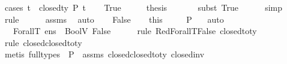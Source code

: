 \begin{isabellebody}
%
\isadelimproof
%
\endisadelimproof
%
\isatagproof
{}\isamarkupfalse%
\ {\isacharparenleft}{\kern0pt}cases\ {\isachardoublequoteopen}{\isasymforall}t\ {\isacharcolon}{\kern0pt}{\isacharcolon}{\kern0pt}\ closed{\isacharunderscore}{\kern0pt}ty{\isachardot}{\kern0pt}\ P\ t{\isachardoublequoteclose}{\isacharparenright}{\kern0pt}\isanewline
\ \ \isamarkupfalse%
\ True\isanewline
\ \ \isamarkupfalse%
\ \isamarkupfalse%
\ {\isacharquery}{\kern0pt}thesis\ \isanewline
\ \ \ \ \isamarkupfalse%
\ {\isacharparenleft}{\kern0pt}subst\ True{\isacharparenright}{\kern0pt}\isanewline
\ \ \ \ \isamarkupfalse%
\ simp\isanewline
\ \ \ \ \isamarkupfalse%
\ rule\isanewline
\ \ \ \ \isamarkupfalse%
\ assms\ \isamarkupfalse%
\ auto\isanewline
{}\isamarkupfalse%
\isanewline
\ \ \isamarkupfalse%
\ False\isanewline
\ \ \isamarkupfalse%
\ this\ \isamarkupfalse%
\ {\isasymtau}\ \ {\isachardoublequoteopen}{\isasymnot}\ P\ {\isasymtau}{\isachardoublequoteclose}\ \isamarkupfalse%
\ auto\isanewline
\ \ \isamarkupfalse%
\ {\isachardoublequoteopen}{\isasymLambda}{\isacharcomma}{\kern0pt}{\isasymGamma}{\isacharcomma}{\kern0pt}{\isasymOmega}\ {\isasymturnstile}\ {\isasymlangle}ForallT\ e{\isacharcomma}{\kern0pt}ns{\isasymrangle}\ {\isasymDown}\ BoolV\ False{\isachardoublequoteclose}\isanewline
\ \ \ \ \isamarkupfalse%
\ {\isacharparenleft}{\kern0pt}rule\ RedForallT{\isacharunderscore}{\kern0pt}False{\isacharbrackleft}{\kern0pt}\ {\isacharquery}{\kern0pt}{\isasymtau}{\isacharequal}{\kern0pt}{\isachardoublequoteopen}closed{\isacharunderscore}{\kern0pt}to{\isacharunderscore}{\kern0pt}ty\ {\isasymtau}{\isachardoublequoteclose}{\isacharbrackright}{\kern0pt}{\isacharparenright}{\kern0pt}\isanewline
\ \ \ \ \ \isamarkupfalse%
\ {\isacharparenleft}{\kern0pt}rule\ closed{\isacharunderscore}{\kern0pt}closed{\isacharunderscore}{\kern0pt}to{\isacharunderscore}{\kern0pt}ty{\isacharparenright}{\kern0pt}\isanewline
\ \ \ \ \isamarkupfalse%
\ {\isacharparenleft}{\kern0pt}metis\ {\isacharparenleft}{\kern0pt}full{\isacharunderscore}{\kern0pt}types{\isacharparenright}{\kern0pt}\ {\isacartoucheopen}{\isasymnot}\ P\ {\isasymtau}{\isacartoucheclose}\ assms\ closed{\isacharunderscore}{\kern0pt}closed{\isacharunderscore}{\kern0pt}to{\isacharunderscore}{\kern0pt}ty\ closed{\isacharunderscore}{\kern0pt}inv{}{\isacharparenright}{\kern0pt}\isanewline

\end{isabellebody}
